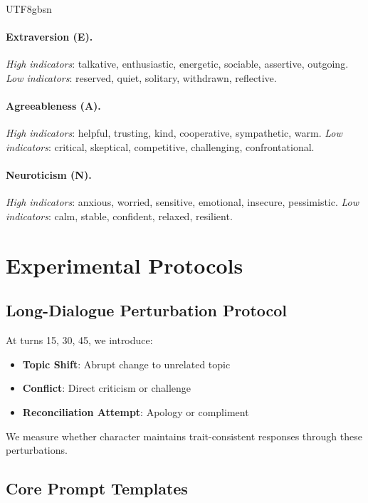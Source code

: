 \documentclass[11pt]{article}
\begin{document}
\begin{CJK*}{UTF8}{gbsn}
\paragraph{Extraversion (E).} \textit{High indicators}: talkative, enthusiastic, energetic, sociable, assertive, outgoing. \textit{Low indicators}: reserved, quiet, solitary, withdrawn, reflective.

\paragraph{Agreeableness (A).} \textit{High indicators}: helpful, trusting, kind, cooperative, sympathetic, warm. \textit{Low indicators}: critical, skeptical, competitive, challenging, confrontational.

\paragraph{Neuroticism (N).} \textit{High indicators}: anxious, worried, sensitive, emotional, insecure, pessimistic. \textit{Low indicators}: calm, stable, confident, relaxed, resilient.

\section{Experimental Protocols}
\label{sec:exp_protocols}

\subsection{Long-Dialogue Perturbation Protocol}
\label{sec:longdialogue}

At turns 15, 30, 45, we introduce:
\begin{itemize}
    \item \textbf{Topic Shift}: Abrupt change to unrelated topic
    \item \textbf{Conflict}: Direct criticism or challenge
    \item \textbf{Reconciliation Attempt}: Apology or compliment
\end{itemize}

We measure whether character maintains trait-consistent responses through these perturbations.

\subsection{Core Prompt Templates}
\label{sec:prompts}


\end{CJK*}
\end{document}
